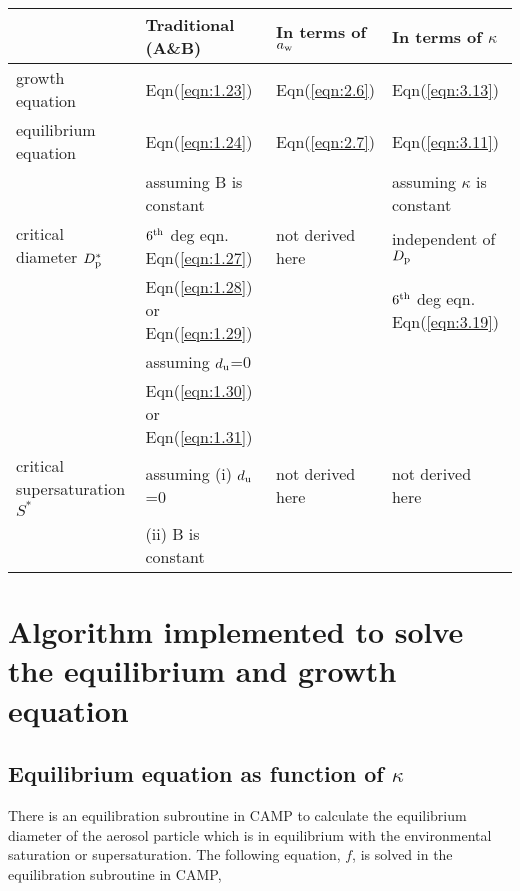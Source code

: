 \documentclass[12pt]{article}
\begin{document}
\begin{tabular}{p{2cm} p{4cm} p{4cm} p{4cm}} 
\hline
             &  Traditional (A\&B)  &   In terms of $a_{\rm w}$  &  In terms of $\kappa$ \\
\hline  \hline             
    growth equation  &  Eqn(\ref{eqn:1.23})   &   Eqn(\ref{eqn:2.6})   &    Eqn(\ref{eqn:3.13}) \\ 
\hline 
    equilibrium equation & Eqn(\ref{eqn:1.24})   &  Eqn(\ref{eqn:2.7})  &  Eqn(\ref{eqn:3.11})  \\
\hline    
              & assuming  B is constant &  &  assuming $\kappa$ is constant   \\
               critical diameter $D_{\rm p}^{*}$  &  $6^{\rm th}$ deg eqn.   Eqn(\ref{eqn:1.27}) & not derived here  &independent of $D_{\rm p}$ \\
                                                  & Eqn(\ref{eqn:1.28}) or Eqn(\ref{eqn:1.29})  &                    & $6^{\rm th}$ deg eqn. Eqn(\ref{eqn:3.19})   \\                               
  &  assuming $d_{\rm u}$=0  &    &    \\
                                                
                                               
\hline
 & Eqn(\ref{eqn:1.30}) or Eqn(\ref{eqn:1.31})  &              &                        \\
 critical supersaturation $S^{*}$   &  assuming (i) $d_{\rm u}$=0  &   not derived here  &  not derived here   \\
  & (ii) B is constant  & &  \\
\hline 
\end{tabular}

\section{Algorithm implemented to solve the equilibrium and growth equation}

\subsection{Equilibrium equation as function of $\kappa$}

There is an equilibration subroutine in CAMP to calculate the equilibrium diameter of the aerosol particle which is in equilibrium with the environmental saturation or supersaturation.
The following equation, $f$, is solved in the equilibration subroutine in CAMP,
\end{document}
